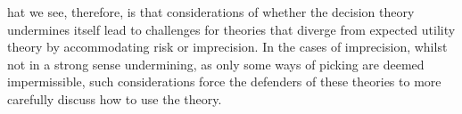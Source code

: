 \documentclass[a4paper]{article}
\renewcommand{\color}[1]{}
\newenvironment{colored}[1]{\leavevmode\color{#1}}{}
\newenvironment{CCM rewritten}
{\begingroup\color{blue}} %
{\endgroup}              %
\begin{document}
\begin{colored}
	
%	
%	
%	
	
	What we see, therefore, is that considerations of whether the decision theory undermines itself lead to challenges for theories that diverge from expected utility theory by accommodating risk or imprecision. In the cases of imprecision, whilst not in a strong sense undermining, as only some ways of picking are deemed impermissible, such considerations force the defenders of these theories to more carefully discuss how to use the theory. 
	
\end{colored}
\end{document}

